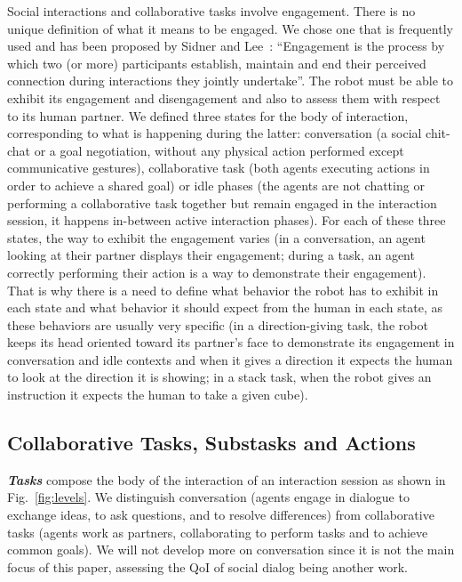 \documentclass[a4paper,11pt,twoside]{StyleThese}
\begin{document}
Social interactions and collaborative tasks involve engagement. There is no unique definition of what it means to be engaged. We chose one that is frequently used and has been proposed by Sidner and Lee~\cite{sidner_2003_engagement}: ``Engagement is the process by which two (or more) participants establish, maintain and end their perceived connection during interactions they jointly undertake''. The robot must be able to exhibit its engagement and disengagement and also to assess them with respect to its human partner.
We defined three states for the body of interaction, corresponding to what is happening during the latter: conversation (\ie a social chit-chat or a goal negotiation, without any physical action performed except communicative gestures), collaborative task (\ie both agents executing actions in order to achieve a shared goal) or idle phases (\ie the agents are not chatting or performing a collaborative task together but remain engaged in the interaction session, it happens in-between active interaction phases). For each of these three states, the way to exhibit the engagement varies (\eg in a conversation, an agent looking at their partner displays their engagement; during a task, an agent correctly performing their action is a way to demonstrate their engagement). That is why there is a need to define what behavior the robot has to exhibit in each state and what behavior it should expect from the human in each state, as these behaviors are usually very specific (\eg in a direction-giving task, the robot keeps its head oriented toward its partner's face to demonstrate its engagement in conversation and idle contexts and when it gives a direction it expects the human to look at the direction it is showing; in a stack task, when the robot gives an instruction it expects the human to take a given cube).


\subsection{Collaborative Tasks, Substasks and Actions}
\textbf{\textit{Tasks}} compose the body of the interaction of an interaction session as shown in Fig.~\ref{fig:levels}. We distinguish conversation (\ie agents engage in dialogue to exchange ideas, to ask questions, and to resolve differences) from collaborative tasks (\ie agents work as partners, collaborating to perform tasks and to achieve common goals). We will not develop more on conversation since it is not the main focus of this paper, assessing the QoI of social dialog being another work.
\end{document}
